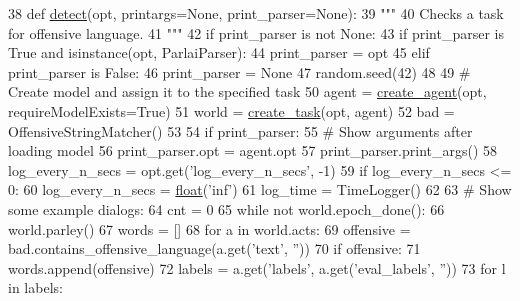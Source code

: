 \begin{DoxyCode}
38 \textcolor{keyword}{def }\hyperlink{namespaceparlai_1_1scripts_1_1detect__offensive__language_aecc66ec4441e506a93d25964889c185f}{detect}(opt, printargs=None, print\_parser=None):
39     \textcolor{stringliteral}{"""}
40 \textcolor{stringliteral}{    Checks a task for offensive language.}
41 \textcolor{stringliteral}{    """}
42     \textcolor{keywordflow}{if} print\_parser \textcolor{keywordflow}{is} \textcolor{keywordflow}{not} \textcolor{keywordtype}{None}:
43         \textcolor{keywordflow}{if} print\_parser \textcolor{keywordflow}{is} \textcolor{keyword}{True} \textcolor{keywordflow}{and} isinstance(opt, ParlaiParser):
44             print\_parser = opt
45         \textcolor{keywordflow}{elif} print\_parser \textcolor{keywordflow}{is} \textcolor{keyword}{False}:
46             print\_parser = \textcolor{keywordtype}{None}
47     random.seed(42)
48 
49     \textcolor{comment}{# Create model and assign it to the specified task}
50     agent = \hyperlink{namespaceparlai_1_1core_1_1agents_a00d77a7e26fb89e8bd900f7b2a02982a}{create\_agent}(opt, requireModelExists=\textcolor{keyword}{True})
51     world = \hyperlink{namespaceparlai_1_1core_1_1worlds_a79969c7ba76d4b3c500f5bb776444dc6}{create\_task}(opt, agent)
52     bad = OffensiveStringMatcher()
53 
54     \textcolor{keywordflow}{if} print\_parser:
55         \textcolor{comment}{# Show arguments after loading model}
56         print\_parser.opt = agent.opt
57         print\_parser.print\_args()
58     log\_every\_n\_secs = opt.get(\textcolor{stringliteral}{'log\_every\_n\_secs'}, -1)
59     \textcolor{keywordflow}{if} log\_every\_n\_secs <= 0:
60         log\_every\_n\_secs = \hyperlink{namespaceprojects_1_1controllable__dialogue_1_1make__control__dataset_aa2b7207688c641dbc094ab44eca27113}{float}(\textcolor{stringliteral}{'inf'})
61     log\_time = TimeLogger()
62 
63     \textcolor{comment}{# Show some example dialogs:}
64     cnt = 0
65     \textcolor{keywordflow}{while} \textcolor{keywordflow}{not} world.epoch\_done():
66         world.parley()
67         words = []
68         \textcolor{keywordflow}{for} a \textcolor{keywordflow}{in} world.acts:
69             offensive = bad.contains\_offensive\_language(a.get(\textcolor{stringliteral}{'text'}, \textcolor{stringliteral}{''}))
70             \textcolor{keywordflow}{if} offensive:
71                 words.append(offensive)
72             labels = a.get(\textcolor{stringliteral}{'labels'}, a.get(\textcolor{stringliteral}{'eval\_labels'}, \textcolor{stringliteral}{''}))
73             \textcolor{keywordflow}{for} l \textcolor{keywordflow}{in} labels:

\end{DoxyCode}
